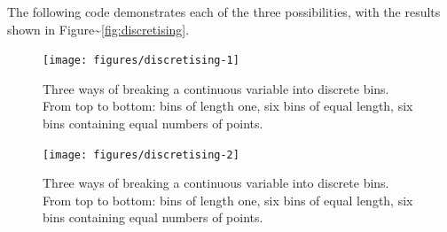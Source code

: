 \noindent The following code demonstrates each of the three
possibilities, with the results shown in
Figure\textasciitilde{}\ref{fig:discretising}.

\begin{Shaded}
\begin{Highlighting}[]
\StringTok{ } \NormalTok{)}
\StringTok{ } \NormalTok{)}
\StringTok{ } \NormalTok{)}

\StringTok{ } \StringTok{ }\NormalTok{(} \NormalTok{, } \NormalTok{)}
\StringTok{ }\NormalTok{(~}\StringTok{ } \NormalTok{)}
\end{Highlighting}
\end{Shaded}

\begin{figure}
\texttt{[image: figures/discretising-1]} \caption{ Three ways of breaking a continuous variable into discrete bins. From top to bottom: bins of length one, six bins of equal length, six bins containing equal numbers of points.\label{fig:discretising1}}
\end{figure}

\begin{Shaded}
\begin{Highlighting}[]
\StringTok{ }\NormalTok{(~}\StringTok{ } \NormalTok{)}
\end{Highlighting}
\end{Shaded}

\begin{figure}
\texttt{[image: figures/discretising-2]} \caption{ Three ways of breaking a continuous variable into discrete bins. From top to bottom: bins of length one, six bins of equal length, six bins containing equal numbers of points.\label{fig:discretising2}}
\end{figure}

\begin{Shaded}
\begin{Highlighting}[]
\StringTok{ }\NormalTok{(~}\StringTok{ } \NormalTok{)}
\end{Highlighting}
\end{Shaded}

